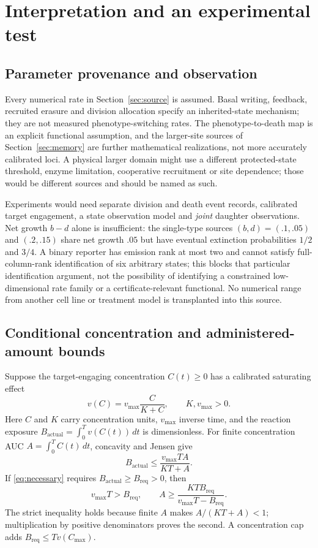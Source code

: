 \section{Interpretation and an experimental test}
\label{sec:interp}

\subsection{Parameter provenance and observation}

Every numerical rate in Section~\ref{sec:source} is assumed. Basal writing,
feedback, recruited erasure and division allocation specify an inherited-state
mechanism; they are not measured phenotype-switching rates. The
phenotype-to-death map is an explicit functional assumption, and the larger-site
sources of Section~\ref{sec:memory} are further mathematical realizations, not
more accurately calibrated loci. A physical larger domain might use a different
protected-state threshold, enzyme limitation, cooperative recruitment or site
dependence; those would be different sources and should be named as such.

Experiments would need separate division and death event records, calibrated
target engagement, a state observation model and \emph{joint} daughter
observations. Net growth $b-d$ alone is insufficient: the single-type sources
$(b,d)=(.1,.05)$ and $(.2,.15)$ share net growth $.05$ but have eventual
extinction probabilities $1/2$ and $3/4$. A binary reporter has emission rank at
most two and cannot satisfy full-column-rank identification of six arbitrary
states; this blocks that particular identification argument, not the possibility
of identifying a constrained low-dimensional rate family or a
certificate-relevant functional. No numerical range from another cell line or
treatment model is transplanted into this source.

\subsection{Conditional concentration and administered-amount bounds}
\label{sec:pkpd}

Suppose the target-engaging concentration $C(t)\ge0$ has a calibrated
saturating effect
\[
 v(C)=v_{\max}\frac{C}{K+C},\qquad K,v_{\max}>0 .
\]
Here $C$ and $K$ carry concentration units, $v_{\max}$ inverse time, and the
reaction exposure $B_{\mathrm{actual}}=\int_0^Tv(C(t))\,dt$ is dimensionless.
For finite concentration AUC $A=\int_0^TC(t)\,dt$, concavity and Jensen give
\[
 B_{\mathrm{actual}}\le\frac{v_{\max}TA}{KT+A}.
\]
If \eqref{eq:necessary} requires $B_{\mathrm{actual}}\ge B_{\mathrm{req}}>0$,
then
\begin{equation}\label{eq:auc}
 v_{\max}T>B_{\mathrm{req}},\qquad
 A\ge\frac{KTB_{\mathrm{req}}}{v_{\max}T-B_{\mathrm{req}}} .
\end{equation}
The strict inequality holds because finite $A$ makes $A/(KT+A)<1$;
multiplication by positive denominators proves the second. A concentration cap
adds $B_{\mathrm{req}}\le Tv(C_{\max})$.


